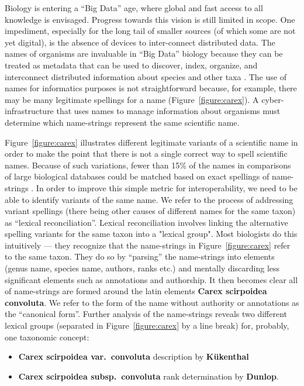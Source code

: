\documentclass{bmcart}
\begin{document}
Biology is entering a ``Big Data'' age, where global and fast access to all knowledge is envisaged. Progress towards this vision is still limited in scope. One impediment, especially for the long tail of smaller sources (of which some are not yet digital), is the absence of devices to inter-connect distributed data. The names of organisms are invaluable in ``Big Data'' biology because they can be treated as metadata that can be used to discover, index, organize, and interconnect distributed information about species and other taxa \cite{Patterson2010}. The use of names for informatics purposes is not straightforward because, for example, there may be many legitimate spellings for a name (Figure~\ref{figure:carex}). A cyber-infrastructure that uses names to manage information about organisms must determine which name-strings represent the same scientific name.

Figure~\ref{figure:carex} illustrates different legitimate variants of a scientific name in order to make the point that there is not a single correct way to spell scientific names. Because of such variations, fewer than 15\% of the names in comparisons of large biological databases could be matched based on exact spellings of name-strings \cite{Patterson2016}. In order to improve this simple metric for interoperability, we need to be able to identify variants of the same name. We refer to the process of addressing variant spellings (there being other causes of different names for the same taxon) as ``lexical reconciliation''.  Lexical reconciliation involves linking the alternative spelling variants for the same taxon into a "lexical group". Most biologists do this intuitively --- they recognize that the name-strings in Figure~\ref{figure:carex} refer to the same taxon. They do so by ``parsing'' the name-strings into elements (genus name, species name, authors, ranks etc.) and mentally discarding less significant elements such as annotations and authorship. It then becomes clear all of name-strings are formed around the latin elements  \textbf{Carex scirpoidea convoluta}. We refer to the form of the name without authority or annotations as the ``canonical form''. Further analysis of the name-strings  reveals two different lexical groups (separated in Figure~\ref{figure:carex} by a line break) for, probably, one taxonomic concept:

\begin{itemize}

  \item \textbf{Carex scirpoidea var.\ convoluta} description by
    \textbf{Kükenthal}

  \item \textbf{Carex scirpoidea subsp.\ convoluta} rank determination by
    \textbf{Dunlop}.

\end{itemize}
\end{document}
